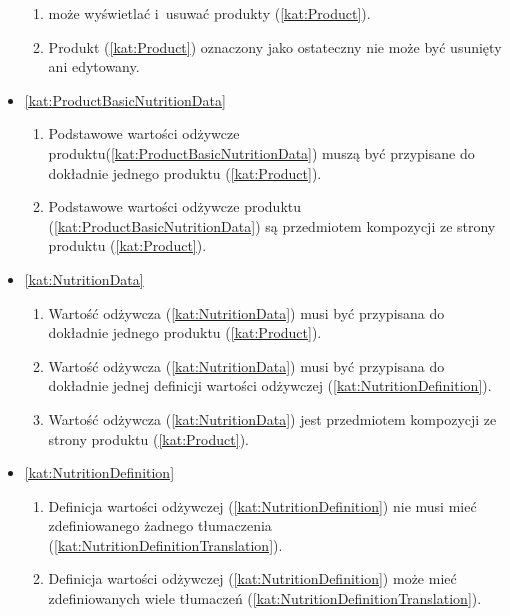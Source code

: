 \begin{itemize}[label={\textbf{Reguły dla}}, wide, labelwidth=!, labelindent=0pt]
\begin{enumerate}[label={\textbf{REG/2/\protect\twodigits{\arabic{enumi}}}}, wide, labelwidth=!, align=left, leftmargin=3cm]
        \item {} może wyświetlać i~usuwać produkty (\ref{kat:Product}).
        \item Produkt (\ref{kat:Product}) oznaczony jako ostateczny nie może być usunięty ani edytowany.
    \end{enumerate}
    \item\ref{kat:ProductBasicNutritionData}\mynobreakpar
    \begin{enumerate}[label={\textbf{REG/2/\protect\twodigits{\arabic{enumi}}}}, wide, labelwidth=!, align=left, leftmargin=3cm, resume]
        \item Podstawowe wartości odżywcze produktu(\ref{kat:ProductBasicNutritionData}) muszą być przypisane do dokładnie jednego produktu (\ref{kat:Product}).
        \item Podstawowe wartości odżywcze produktu (\ref{kat:ProductBasicNutritionData}) są przedmiotem kompozycji ze strony produktu (\ref{kat:Product}).
    \end{enumerate}
    \item\ref{kat:NutritionData}\mynobreakpar
    \begin{enumerate}[label={\textbf{REG/2/\protect\twodigits{\arabic{enumi}}}}, wide, labelwidth=!, align=left, leftmargin=3cm, resume]
        \item Wartość odżywcza (\ref{kat:NutritionData}) musi być przypisana do dokładnie jednego produktu (\ref{kat:Product}).
        \item Wartość odżywcza (\ref{kat:NutritionData}) musi być przypisana do dokładnie jednej definicji wartości odżywczej (\ref{kat:NutritionDefinition}).
        \item Wartość odżywcza (\ref{kat:NutritionData}) jest przedmiotem kompozycji ze strony produktu (\ref{kat:Product}).
    \end{enumerate}
    \item\ref{kat:NutritionDefinition}\mynobreakpar
    \begin{enumerate}[label={\textbf{REG/2/\protect\twodigits{\arabic{enumi}}}}, wide, labelwidth=!, align=left, leftmargin=3cm, resume]
        \item Definicja wartości odżywczej (\ref{kat:NutritionDefinition}) nie musi mieć zdefiniowanego żadnego tłumaczenia (\ref{kat:NutritionDefinitionTranslation}).
        \item Definicja wartości odżywczej (\ref{kat:NutritionDefinition}) może mieć zdefiniowanych wiele tłumaczeń (\ref{kat:NutritionDefinitionTranslation}).

\end{enumerate}
\end{itemize}
